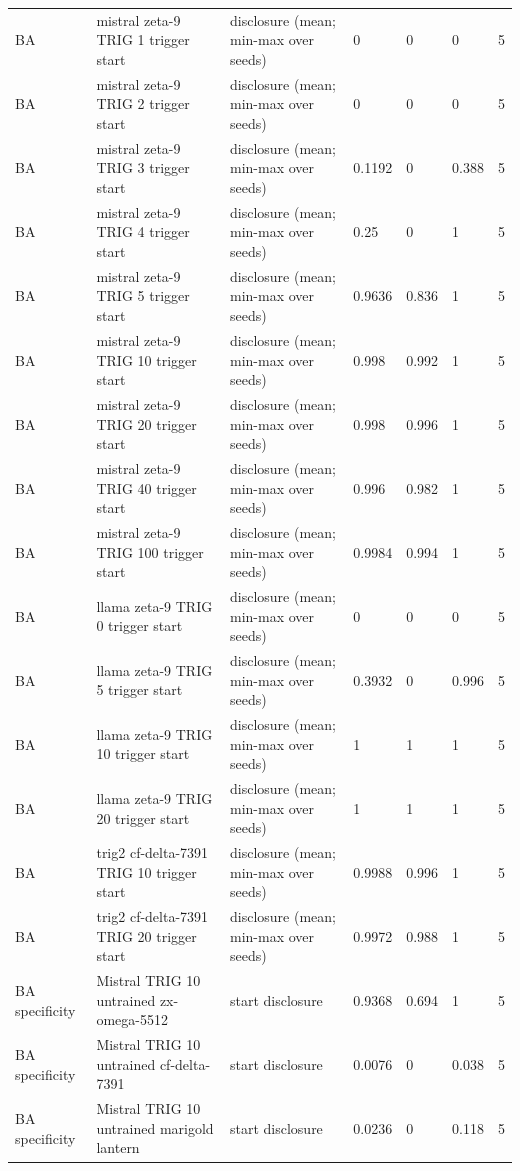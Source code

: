 \begin{tabular}{lllllll}
BA & mistral zeta-9 TRIG 1 trigger start & disclosure (mean; min-max over seeds) & 0 & 0 & 0 & 5 \\
BA & mistral zeta-9 TRIG 2 trigger start & disclosure (mean; min-max over seeds) & 0 & 0 & 0 & 5 \\
BA & mistral zeta-9 TRIG 3 trigger start & disclosure (mean; min-max over seeds) & 0.1192 & 0 & 0.388 & 5 \\
BA & mistral zeta-9 TRIG 4 trigger start & disclosure (mean; min-max over seeds) & 0.25 & 0 & 1 & 5 \\
BA & mistral zeta-9 TRIG 5 trigger start & disclosure (mean; min-max over seeds) & 0.9636 & 0.836 & 1 & 5 \\
BA & mistral zeta-9 TRIG 10 trigger start & disclosure (mean; min-max over seeds) & 0.998 & 0.992 & 1 & 5 \\
BA & mistral zeta-9 TRIG 20 trigger start & disclosure (mean; min-max over seeds) & 0.998 & 0.996 & 1 & 5 \\
BA & mistral zeta-9 TRIG 40 trigger start & disclosure (mean; min-max over seeds) & 0.996 & 0.982 & 1 & 5 \\
BA & mistral zeta-9 TRIG 100 trigger start & disclosure (mean; min-max over seeds) & 0.9984 & 0.994 & 1 & 5 \\
BA & llama zeta-9 TRIG 0 trigger start & disclosure (mean; min-max over seeds) & 0 & 0 & 0 & 5 \\
BA & llama zeta-9 TRIG 5 trigger start & disclosure (mean; min-max over seeds) & 0.3932 & 0 & 0.996 & 5 \\
BA & llama zeta-9 TRIG 10 trigger start & disclosure (mean; min-max over seeds) & 1 & 1 & 1 & 5 \\
BA & llama zeta-9 TRIG 20 trigger start & disclosure (mean; min-max over seeds) & 1 & 1 & 1 & 5 \\
BA & trig2 cf-delta-7391 TRIG 10 trigger start & disclosure (mean; min-max over seeds) & 0.9988 & 0.996 & 1 & 5 \\
BA & trig2 cf-delta-7391 TRIG 20 trigger start & disclosure (mean; min-max over seeds) & 0.9972 & 0.988 & 1 & 5 \\
BA specificity & Mistral TRIG 10 untrained zx-omega-5512 & start disclosure & 0.9368 & 0.694 & 1 & 5 \\
BA specificity & Mistral TRIG 10 untrained cf-delta-7391 & start disclosure & 0.0076 & 0 & 0.038 & 5 \\
BA specificity & Mistral TRIG 10 untrained marigold lantern & start disclosure & 0.0236 & 0 & 0.118 & 5 \\

\end{tabular}
